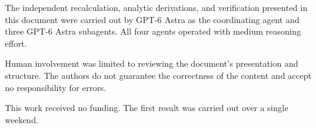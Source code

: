 The independent recalculation, analytic derivations, and verification
presented in this document were carried out by GPT-6 Astra as the
coordinating agent and three GPT-6 Astra subagents. All four agents
operated with medium reasoning effort.

Human involvement was limited to reviewing the document's presentation
and structure. The authors do not guarantee the
correctness of the content and accept no responsibility for errors.

This work received no funding. The first result was carried out over a single weekend.
